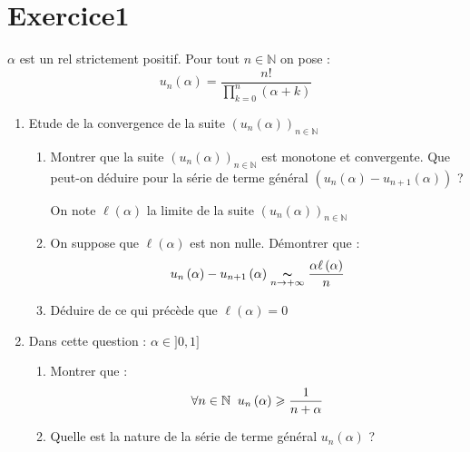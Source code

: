 \documentclass[a4paper, 11pt,reqno]{article}
\author{Olivier Glorieux}
\begin{document}
\section*{Exercice1}

$\alpha $ est un rel strictement positif. Pour tout $n\in \mathbb{N}$ on
pose : 
\begin{equation*}
u_{n}\left( \alpha \right) =\dfrac{n!}{\prod\limits_{k=0}^{n}\left( \alpha
+k\right) }
\end{equation*}

\begin{enumerate}
\item Etude de la convergence de la suite $\left( u_{n}\left( \alpha \right)
\right) _{n\in \mathbb{N}}$

\begin{enumerate}
\item Montrer que la suite $\left( u_{n}\left( \alpha \right) \right) _{n\in 
\mathbb{N}}$ est monotone et convergente. Que peut-on déduire pour la série
de terme général $\left( u_{n}\left( \alpha \right) -u_{n+1}\left( \alpha
\right) \right) $ ?

On note $\ell \left( \alpha \right) $ la limite de la suite $\left(
u_{n}\left( \alpha \right) \right) _{n\in \mathbb{N}}$

\item On suppose que $\ell \left( \alpha \right) $ est non nulle. Démontrer
que : 
\begin{equation*}
u_{n}\left( \alpha \right) -u_{n+1}\left( \alpha \right) \underset{%
n\rightarrow +\infty }{\thicksim }\dfrac{\alpha \ell \left( \alpha \right) }{%
n}
\end{equation*}

\item Déduire de ce qui précède que $\ell \left( \alpha \right) =0$
\end{enumerate}

\item Dans cette question : $\alpha \in ]0,1]$

\begin{enumerate}
\item Montrer que : 
\begin{equation*}
\forall n\in \mathbb{N\;\;}u_{n}\left( \alpha \right) \geqslant \dfrac{1}{%
n+\alpha }
\end{equation*}

\item Quelle est la nature de la série de terme général $u_{n}\left( \alpha
\right) $ ?
\end{enumerate}


\end{enumerate}
\end{document}
